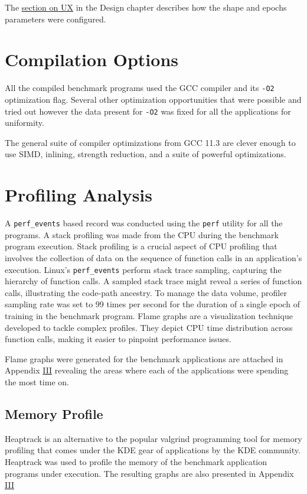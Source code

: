The \hyperref[section:hdrnn-ux]{section on UX} in the Design chapter describes how the shape and epochs parameters were configured.

\section{Compilation Options}

All the compiled benchmark programs used the GCC compiler and its \texttt{-O2} optimization flag. Several other optimization opportunities that were possible and tried out however the data present for \texttt{-O2} was fixed for all the applications for uniformity.

The general suite of compiler optimizations from GCC 11.3 are clever enough to use SIMD, inlining, strength reduction, and a suite of powerful optimizations.

\section{Profiling Analysis}

A \texttt{perf\_events} based record was conducted using the \texttt{perf} utility for all the programs. A stack profiling was made from the CPU during the benchmark program execution. Stack profiling is a crucial aspect of CPU profiling that involves the collection of data on the sequence of function calls in an application's execution. Linux's \texttt{perf\_events} perform stack trace sampling, capturing the hierarchy of function calls. A sampled stack trace might reveal a series of function calls, illustrating the code-path ancestry. To manage the data volume, profiler sampling rate was set to 99 times per second for the duration of a single epoch of training in the benchmark program. Flame graphs are a visualization technique developed to tackle complex profiles. They depict CPU time distribution across function calls, making it easier to pinpoint performance issues.

Flame graphs were generated for the benchmark applications are attached in Appendix \hyperref[hdrnn-profile]{III} revealing the areas where each of the applications were spending the most time on.

\subsection{Memory Profile}

Heaptrack is an alternative to the popular valgrind programming tool for memory profiling that comes under the KDE gear of applications by the KDE community. Heaptrack was used to profile the memory of the benchmark application programs under execution. The resulting graphs are also presented in Appendix \hyperref[hdrnn-memory-profile]{III}



